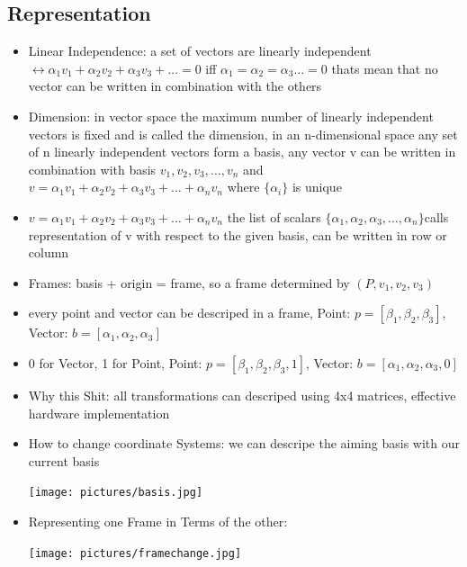 \documentclass[11pt,a4paper]{article}
\begin{document}
	\subsection{Representation}
	\begin{itemize}
		\item Linear Independence: a set of vectors are linearly independent $\leftrightarrow \alpha_{1}v_{1}+\alpha_{2}v_{2}+\alpha_{3}v_{3} +\dots = 0$ iff $\alpha_{1}=\alpha_{2}=\alpha_{3}\dots = 0$ thats mean that no vector can be written in combination with the others
		\item Dimension: in vector space the maximum number of linearly independent vectors is fixed and is called the dimension, in an n-dimensional space any set of n linearly independent vectors form a basis, any vector v can be written in combination with basis $v_{1},v_{2},v_{3},\dots,v_{n}$ and $v= \alpha_{1}v_{1}+\alpha_{2}v_{2}+\alpha_{3}v_{3} +\dots+\alpha_{n}v_{n}$ where $\{\alpha_{i}\}$ is unique
		\item  $v= \alpha_{1}v_{1}+\alpha_{2}v_{2}+\alpha_{3}v_{3} +\dots+\alpha_{n}v_{n}$ the list of scalars $\{\alpha_{1},\alpha_{2},\alpha_{3},\dots,\alpha_{n}\} $calls representation of v with respect to the given basis, can be written in row or column
		\item Frames: basis + origin = frame, so a frame determined by $(P,v_{1},v_{2},v_{3})$
		\item every point and vector can be descriped in a frame, Point: $p=[\beta_{1},\beta_{2},\beta_{3}]$, Vector: $b=[\alpha_{1},\alpha_{2},\alpha_{3}]$
		\item 0 for Vector, 1 for Point, Point: $p=[\beta_{1},\beta_{2},\beta_{3},1]$, Vector: $b=[\alpha_{1},\alpha_{2},\alpha_{3},0]$
		\item Why this Shit: all transformations can descriped using 4x4 matrices, effective hardware implementation
		\item How to change coordinate Systems: we can descripe the aiming basis with our current basis 
		\begin{center}
			\texttt{[image: pictures/basis.jpg]}
		\end{center}
		\item Representing one Frame in Terms of the other:
		\begin{center}
			\texttt{[image: pictures/framechange.jpg]}
		\end{center}		
	\end{itemize}
\end{document}
